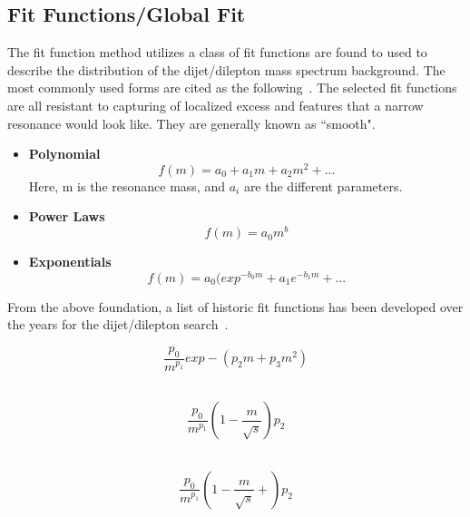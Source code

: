 \subsection{Fit Functions/Global Fit}
\label{sec:fitfunction}
    The fit function method utilizes a class of fit functions are found to used to describe the distribution of the dijet/dilepton mass spectrum background. The most commonly used forms are cited as the following~\cite{ATL-PHYS-PUB-2020-028}. The selected fit functions are all resistant to capturing of localized excess and features that a narrow resonance would look like. They are generally known as ``smooth".

    \begin{itemize}

    \item \textbf{Polynomial}
        \begin{equation}
            f(m)= a_0 + a_{1}m + a_{2}m^{2}+...
        \end{equation} Here, m is the resonance mass, and $a_{i}$ are the different parameters.
    \item \textbf{Power Laws}
        \begin{equation}
            f(m)= a_{0}m^{b}
        \end{equation}

    \item \textbf{Exponentials}
        \begin{equation}
            f(m) = a_{0}(exp^{-b_{0}m} +a_{1}e^{-b_{1}m}+...
        \end{equation}

    \end{itemize}

From the above foundation, a list of historic fit functions has been developed over the years for the dijet/dilepton search~\cite{Pachal:2063032}.

    \begin{equation}
        \frac{p_{0}}{m^{p_{1}}}exp-(p_{2}m+p_{3}m^{2})
    \end{equation}~\cite{UA2:1990gao}

    \begin{equation}
        \frac{p_{0}}{m^{p_{1}}}(1-\frac{m}{\sqrt{s}})p_{2}
    \end{equation}~\cite{1995}

    \begin{equation}
        \frac{p_{0}}{m^{p_{1}}}(1-\frac{m}{\sqrt{s}}+)p_{2}
    \end{equation}~\cite{b582dc2d9c234174bfe2adbc9729bf42}

